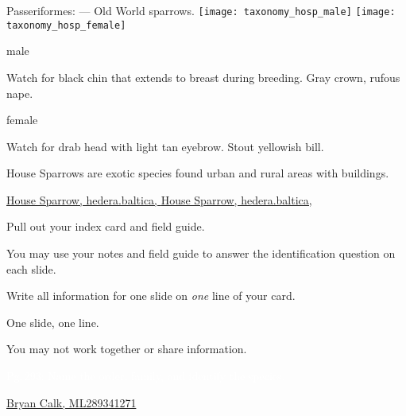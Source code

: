 \documentclass[t]{beamer}
\newcommand{\backoneline}{\vspace{-\baselineskip}}
\begin{document}
\begin{frame}{Passeriformes:  — Old World sparrows.}
	\texttt{[image: taxonomy\_hosp\_male]}\hfill
	\texttt{[image: taxonomy\_hosp\_female]}
	
	\backoneline
	
	\begin{multicols}{2}
		male
		
		\medskip
		
		Watch for black chin that extends to breast during breeding. Gray crown, rufous nape.
		\columnbreak
		
		female
				
		\medskip
		
		Watch for drab head with light tan eyebrow. Stout yellowish bill. \phantom{Hidden words to fill space.}
		
		
	\end{multicols}	
	
	House Sparrows are exotic species found urban and rural areas with buildings.
	
	
	\vfilll
	
	\tiny
	
	\href{https://flickr.com/photos/hedera_baltica/32691733707}{House Sparrow, hedera.baltica, } \hfill 
	\href{https://flickr.com/photos/hedera_baltica/52118904483}{House Sparrow, hedera.baltica, }
	
	
\end{frame}


\begin{frame}{Pull out your index card and field guide.}
	
	\hangpara You may use your notes and field guide to answer the identification question on each slide.
	
	\hangpara Write all information for one slide on \textit{one} line of your card.
	
	\hangpara One slide, one line.
	
	\hangpara You may not work together or share information.
	
	
\end{frame}

{
	\begin{frame}[t]{\textcolor{white}{Pg.\,293: Name the order, family, and identify the species.}}
		
		\tinyfill  \textcolor{white}{\href{https://macaulaylibrary.org/asset/289341271}{Bryan Calk, ML289341271}}
	\end{frame}
}
\end{document}
